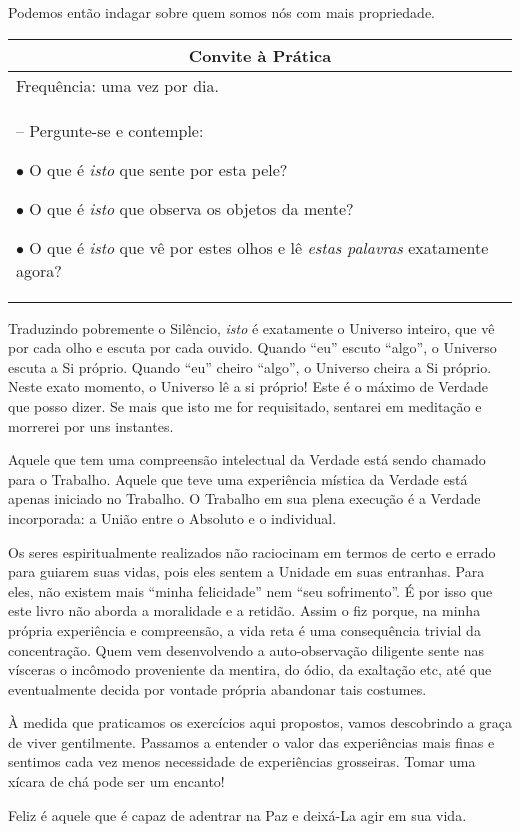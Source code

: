 \documentclass[oneside, 12pt]{book}
\newenvironment{prat}[1]
{\begin{center}
\begin{tabular}{p{0.9\textwidth}}
\hline\hline
\multicolumn{1}{c}{Convite à Prática}\\
\hline
Frequência: #1.\\
\hline
}{\\
\hline\hline
\end{tabular} 
\end{center}}
\begin{document}
Podemos então indagar sobre quem somos nós com mais propriedade.

\begin{prat}{uma vez por dia}

-- Pergunte-se e contemple:

$\bullet$ O que é \textit{isto} que sente por esta pele?

$\bullet$ O que é \textit{isto} que observa os objetos da mente?

$\bullet$ O que é \textit{isto} que vê por estes olhos e lê \textit{estas palavras} exatamente agora?
\end{prat}

Traduzindo pobremente o Silêncio, \textit{isto} é exatamente o Universo inteiro, que vê por cada olho e escuta por cada ouvido. Quando ``eu'' escuto ``algo'', o Universo escuta a Si próprio. Quando ``eu'' cheiro ``algo'', o Universo cheira a Si próprio. Neste exato momento, o Universo lê a si próprio! Este é o máximo de Verdade que posso dizer. Se mais que isto me for requisitado, sentarei em meditação e morrerei por uns instantes.

Aquele que tem uma compreensão intelectual da Verdade está sendo chamado para o Trabalho. Aquele que teve uma experiência mística da Verdade está apenas iniciado no Trabalho. O Trabalho em sua plena execução é a Verdade incorporada: a União entre o Absoluto e o individual.

Os seres espiritualmente realizados não raciocinam em termos de certo e errado para guiarem suas vidas, pois eles sentem a Unidade em suas entranhas. Para eles, não existem mais ``minha felicidade'' nem ``seu sofrimento''. É por isso que este livro não aborda a moralidade e a retidão. Assim o fiz porque, na minha própria experiência e compreensão, a vida reta é uma consequência trivial da concentração. Quem vem desenvolvendo a auto-observação diligente sente nas vísceras o incômodo proveniente da mentira, do ódio, da exaltação etc, até que eventualmente decida por vontade própria abandonar tais costumes.

À medida que praticamos os exercícios aqui propostos, vamos descobrindo a graça de viver gentilmente. Passamos a entender o valor das experiências mais finas e sentimos cada vez menos necessidade de experiências grosseiras. Tomar uma xícara de chá pode ser um encanto!

Feliz é aquele que é capaz de adentrar na Paz e deixá-La agir em sua vida.
\end{document}
